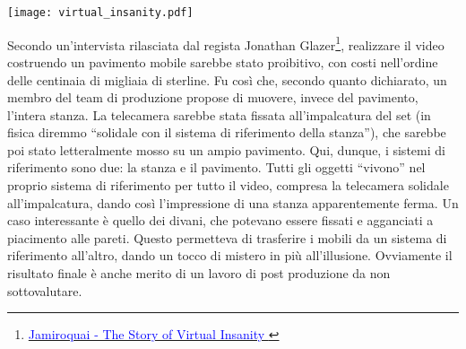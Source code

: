 \begin{marginfigure}
    \centering
    \texttt{[image: virtual\_insanity.pdf]}
    \caption{Schema semplificato del set realizzato per il video musicale:
    (1) telecamera fissata alla stanza mobile, (2) Jay Kay che si diverte,
    (3) stanza mobile, (4) pavimento del set.}
\end{marginfigure}


Secondo un'intervista rilasciata dal regista Jonathan Glazer\footnote{\href{https://www.youtube.com/watch?v=nY6YwZzKzTI}{\textcolor{blue}{Jamiroquai - The Story of Virtual Insanity
}}}, realizzare il video costruendo un pavimento mobile sarebbe
stato proibitivo, con costi nell'ordine delle centinaia di migliaia
di sterline. Fu così che, secondo quanto dichiarato, un membro del team di produzione
propose di muovere, invece del pavimento, l'intera stanza.
La telecamera sarebbe stata fissata all'impalcatura del set
(in fisica diremmo ``solidale con il sistema di riferimento
della stanza''), che sarebbe poi stato letteralmente mosso
su un ampio pavimento.
Qui, dunque, i sistemi di riferimento sono due: la stanza e il
pavimento. Tutti gli oggetti ``vivono'' nel proprio sistema
di riferimento per tutto il video, compresa la telecamera solidale
all'impalcatura, dando così l'impressione di
una stanza apparentemente ferma. Un caso interessante è
quello dei divani, che potevano essere fissati e agganciati
a piacimento alle pareti. Questo permetteva di trasferire
i mobili da un sistema di riferimento all'altro, dando un
tocco di mistero in più all'illusione. Ovviamente il risultato finale
è anche merito di un lavoro di post produzione da non sottovalutare.

